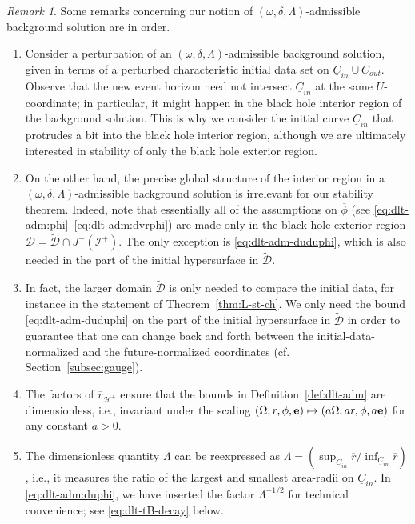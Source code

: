 \documentclass[10pt, reqno]{amsart}
\theoremstyle{definition}
\theoremstyle{remark}
\newtheorem{remark}[theorem]{Remark}
\theoremstyle{conjecture}
\numberwithin{equation}{section}
\newcommand{\0}{\emptyset}
\newcommand{\dlt}{\delta}
\newcommand{\Lmb}{\Lambda}
\newcommand{\omg}{\omega}
\newcommand{\Omg}{\Omega}
\newcommand{\bfe}{{\bf e}}
\newcommand{\calD}{\mathcal D}
\newcommand{\calH}{\mathcal H}
\newcommand{\calI}{\mathcal I}
\newcommand{\uC}{\underline{C}}
\newcommand{\EH}{\calH^{+}}
\newcommand{\e}{\bfe}							%
\newcommand{\NI}{\calI^{+}}						%
\newcommand{\phibg}{\overline{\phi}}				%
\newcommand{\rbg}{\overline{r}}					%
\newcommand{\varpibg}{\overline{\varpi}}				%
\begin{document}
\begin{remark} \label{rem:dlt-admissible}
Some remarks concerning our notion of $(\omg, \dlt, \Lmb)$-admissible background solution are in order.
\begin{enumerate}
\item Consider a perturbation of an $(\omg, \dlt, \Lmb)$-admissible background solution, given in terms of a perturbed characteristic initial data set on $\uC_{in} \cup C_{out}$. 
Observe that the new event horizon need not intersect $\uC_{in}$ at the same $U$-coordinate; in particular, it might happen in the black hole interior region of the background solution. This is why we consider the initial curve $\uC_{in}$ that protrudes a bit into the black hole interior region, although we are ultimately interested in stability of only the black hole exterior region.
\item On the other hand, the precise global structure of the interior region in a $(\omg, \dlt, \Lmb)$-admissible background solution is irrelevant for our stability theorem. Indeed, note that essentially all of the assumptions on $\phibg$ (see \eqref{eq:dlt-adm:phi}--\eqref{eq:dlt-adm:dvrphi}) are made only in the black hole exterior region $\calD = \widetilde{\calD} \cap J^{-}(\NI)$. The only exception is \eqref{eq:dlt-adm-duduphi}, which is also needed in the part of the initial hypersurface in $\widetilde{\calD}$. 
\item In fact, the larger domain $\widetilde{\calD}$ is only needed to compare the initial data, for instance in the statement of Theorem~\ref{thm:L-st-ch}. We only need the bound \eqref{eq:dlt-adm-duduphi} on the part of the initial hypersurface in $\widetilde{\calD}$ in order to guarantee that one can change back and forth between the initial-data-normalized and the future-normalized coordinates (cf. Section~\ref{subsec:gauge}).
\item The factors of $\rbg_{\EH}$ ensure that the bounds in Definition~\ref{def:dlt-adm} are dimensionless, i.e., invariant under the scaling $(\Omg, r, \phi, \e) \mapsto (a \Omg, a r, \phi, a \e)$ for any constant $a > 0$.
\item The dimensionless quantity $\Lmb$ can be reexpressed as $\Lmb = (\sup_{\uC_{in}} \rbg / \inf_{\uC_{in}} \rbg)$, i.e., it measures the ratio of the largest and smallest area-radii on $\uC_{in}$. In \eqref{eq:dlt-adm:duphi}, we have inserted the factor $\Lmb^{-1/2}$ for technical convenience; see \eqref{eq:dlt-tB-decay} below.
\end{enumerate}
\end{remark}
\end{document}
